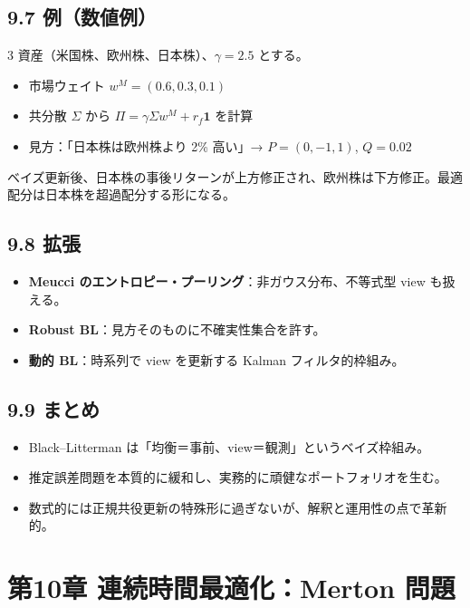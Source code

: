 \documentclass[11pt,a4paper]{report}
\begin{document}
\section{9.7 例（数値例）}

3 資産（米国株、欧州株、日本株）、$\gamma = 2.5$ とする。
\begin{itemize}
\item 市場ウェイト $w^M = (0.6, 0.3, 0.1)$
\item 共分散 $\Sigma$ から $\Pi = \gamma\Sigma w^M + r_f\mathbf{1}$ を計算
\item 見方：「日本株は欧州株より 2\% 高い」→ $P = (0, -1, 1)$, $Q = 0.02$
\end{itemize}

ベイズ更新後、日本株の事後リターンが上方修正され、欧州株は下方修正。最適配分は日本株を超過配分する形になる。

\section{9.8 拡張}

\begin{itemize}
\item \textbf{Meucci のエントロピー・プーリング}：非ガウス分布、不等式型 view も扱える。
\item \textbf{Robust BL}：見方そのものに不確実性集合を許す。
\item \textbf{動的 BL}：時系列で view を更新する Kalman フィルタ的枠組み。
\end{itemize}

\section{9.9 まとめ}

\begin{itemize}
\item Black–Litterman は「均衡＝事前、view＝観測」というベイズ枠組み。
\item 推定誤差問題を本質的に緩和し、実務的に頑健なポートフォリオを生む。
\item 数式的には正規共役更新の特殊形に過ぎないが、解釈と運用性の点で革新的。
\end{itemize}

\noindent\hrulefill

\chapter{第10章 連続時間最適化：Merton 問題}
\end{document}
